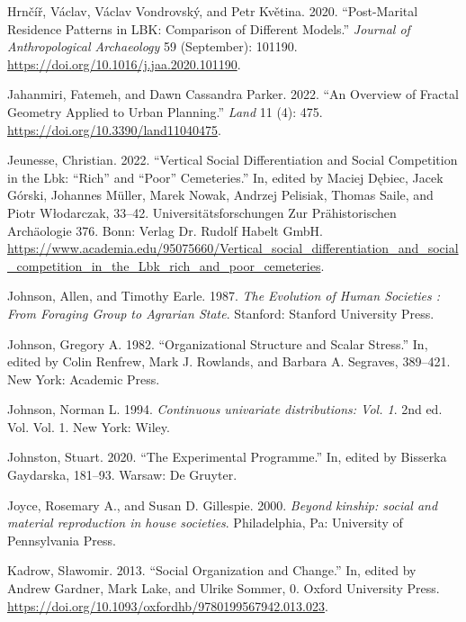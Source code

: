 \documentclass[
  12pt,
  a4paper, twoside]{book}
\newlength{\cslhangindent}
\newlength{\cslentryspacingunit} %
\newenvironment{CSLReferences}[2] %
 {%
  \setlength{\parindent}{0pt}
  \ifodd #1
  \let\oldpar\par
  \def\par{\hangindent=\cslhangindent\oldpar}
  \fi
  \setlength{\parskip}{#2\cslentryspacingunit}
 }%
 {}
\begin{document}
\begin{CSLReferences}{1}{0}
\leavevmode{}%
Hrnčíř, Václav, Václav Vondrovský, and Petr Květina. 2020. {``Post-Marital Residence Patterns in LBK: Comparison of Different Models.''} \emph{Journal of Anthropological Archaeology} 59 (September): 101190. \url{https://doi.org/10.1016/j.jaa.2020.101190}.

\leavevmode{}%
Jahanmiri, Fatemeh, and Dawn Cassandra Parker. 2022. {``An Overview of Fractal Geometry Applied to Urban Planning.''} \emph{Land} 11 (4): 475. \url{https://doi.org/10.3390/land11040475}.

\leavevmode{}%
Jeunesse, Christian. 2022. {``Vertical Social Differentiation and Social Competition in the Lbk: {``}Rich{''} and {``}Poor{''} Cemeteries.''} In, edited by Maciej Dębiec, Jacek Górski, Johannes Müller, Marek Nowak, Andrzej Pelisiak, Thomas Saile, and Piotr Włodarczak, 33--42. Universitätsforschungen Zur Prähistorischen Archäologie 376. Bonn: Verlag Dr. Rudolf Habelt GmbH. \url{https://www.academia.edu/95075660/Vertical_social_differentiation_and_social_competition_in_the_Lbk_rich_and_poor_cemeteries}.

\leavevmode{}%
Johnson, Allen, and Timothy Earle. 1987. \emph{The Evolution of Human Societies : From Foraging Group to Agrarian State}. Stanford: Stanford University Press.

\leavevmode{}%
Johnson, Gregory A. 1982. {``Organizational Structure and Scalar Stress.''} In, edited by Colin Renfrew, Mark J. Rowlands, and Barbara A. Segraves, 389--421. New York: Academic Press.

\leavevmode{}%
Johnson, Norman L. 1994. \emph{Continuous univariate distributions: Vol. 1}. 2nd ed. Vol. Vol. 1. New York: Wiley.

\leavevmode{}%
Johnston, Stuart. 2020. {``The Experimental Programme.''} In, edited by Bisserka Gaydarska, 181--93. Warsaw: De Gruyter.

\leavevmode{}%
Joyce, Rosemary A., and Susan D. Gillespie. 2000. \emph{Beyond kinship: social and material reproduction in house societies}. Philadelphia, Pa: University of Pennsylvania Press.

\leavevmode{}%
Kadrow, Sławomir. 2013. {``Social Organization and Change.''} In, edited by Andrew Gardner, Mark Lake, and Ulrike Sommer, 0. Oxford University Press. \url{https://doi.org/10.1093/oxfordhb/9780199567942.013.023}.


\end{CSLReferences}
\end{document}
